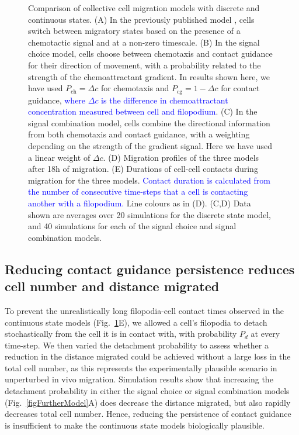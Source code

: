 \documentclass[review]{elsarticle}
\newcommand\hl[1]{{\textcolor{blue}{#1}}}
\begin{document}
\begin{figure}
    \caption{Comparison of collective cell migration models with discrete and continuous states. (A) In the previously published model \cite{McLennan2015b}, cells switch between migratory states based on the presence of a chemotactic signal and at a non-zero timescale. (B) In the signal choice model, cells choose between chemotaxis and contact guidance for their direction of movement, with a probability related to the strength of the chemoattractant gradient. In results shown here, we have used $P_\mathrm{ch}=\Delta c$ for chemotaxis and $P_\mathrm{cg}=1 - \Delta c$ for contact guidance,  \hl{where $\Delta c$ is the difference in chemoattractant concentration measured between cell and filopodium}. (C) In the signal combination model, cells combine the directional information from both chemotaxis and contact guidance, with a weighting depending on the strength of the gradient signal. Here we have used a linear weight of $\Delta c$. (D) Migration profiles of the three models after 18h of migration. (E) Durations of cell-cell contacts during migration for the three models. \hl{Contact duration is calculated from the number of consecutive time-steps that a cell is contacting another with a filopodium.} Line colours as in (D). (C,D) Data shown are averages over 20 simulations for the discrete state model, and 40 simulations for each of the signal choice and signal combination models. \label{figNaiveModel}}
\end{figure}

\subsection{Reducing contact guidance persistence reduces cell number and distance migrated}
To prevent the unrealistically long filopodia-cell contact times observed in the continuous state models (Fig.~\ref{figNaiveModel}E), we allowed a cell's filopodia to detach stochastically from the cell it is in contact with, with probability $P_d$ at every time-step. We then varied the detachment probability to assess whether a reduction in the distance migrated could be achieved without a large loss in the total cell number, as this represents the experimentally plausible scenario in unperturbed in vivo migration. Simulation results show that increasing the detachment probability in either the signal choice or signal combination models (Fig.~\ref{figFurtherModel}A) does decrease the distance migrated, but also rapidly decreases total cell number. Hence, reducing the persistence of contact guidance is insufficient to make the continuous state models biologically plausible.
\end{document}
